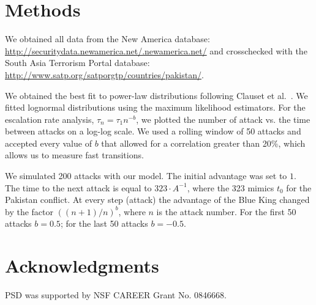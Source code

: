 \documentclass[preprint,12pt]{elsarticle}
\begin{document}
\section*{Methods}
We obtained all data from the New America database:
\url{http://securitydata.newamerica.net/.newamerica.net/} and crosschecked with the South Asia Terrorism Portal
database:
\url{http://www.satp.org/satporgtp/countries/pakistan/}.

We obtained the best fit to power-law distributions following Clauset et
al.~\cite{Clauset2009}. We fitted lognormal distributions using the
maximum likelihood estimators. For the escalation rate analysis, $\tau_n
= \tau_1 n^{-b}$, we plotted the number of attack vs. the time between
attacks on a log-log scale. We used a rolling window of 50 attacks and accepted every value of $b$ that
allowed for a correlation greater than 20\%, which allows us to
measure fast transitions.

We simulated 200 attacks with our
model. The initial advantage was set to $1$. The time to the
next attack is equal to $323 \cdot A^{-1}$, where the 323 mimics $t_0$ for the Pakistan conflict. At every step (attack) the advantage
of the Blue King changed by the factor 
$\left((n+1)/n\right)^b$, where $n$ is the attack number.
For the first 50 attacks 
$b = 0.5$; 
for the last 50 attacks 
$b = -0.5$.

\section*{Acknowledgments}
PSD was supported by NSF CAREER Grant No. 0846668.
\end{document}
